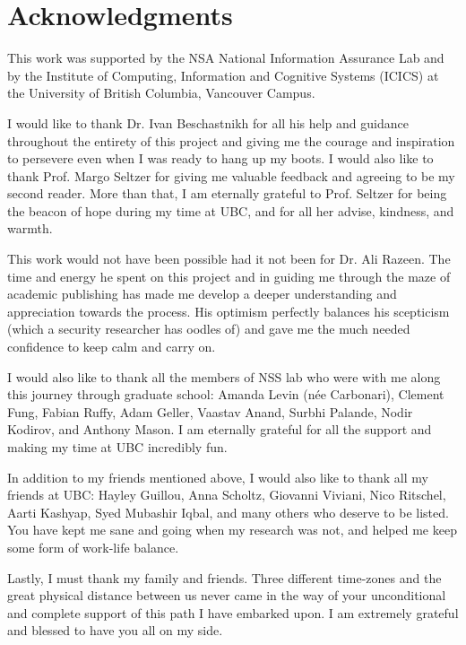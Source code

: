 
\chapter{Acknowledgments}

This work was supported by the NSA National Information Assurance Lab and by the Institute of Computing, Information and Cognitive Systems (ICICS) at the University of British Columbia, Vancouver Campus.

I would like to thank Dr. Ivan Beschastnikh for all his help and guidance throughout the entirety of this project and giving me the courage and inspiration to persevere even when I was ready to hang up my boots. I would also like to thank Prof. Margo Seltzer for giving me valuable feedback and agreeing to be my second reader. More than that, I am eternally grateful to Prof. Seltzer for being the beacon of hope during my time at UBC, and for all her advise, kindness, and warmth. 

This work would not have been possible had it not been for Dr. Ali Razeen. The time and energy he spent on this project and in guiding me through the maze of academic publishing has made me develop a deeper understanding and appreciation towards the process. His optimism perfectly balances his scepticism (which a security researcher has oodles of) and gave me the much needed confidence to keep calm and carry on.

I would also like to thank all the members of NSS lab who were with me along this journey through graduate school: Amanda Levin (n\'ee Carbonari), Clement Fung, Fabian Ruffy, Adam Geller, Vaastav Anand, Surbhi Palande, Nodir Kodirov, and Anthony Mason. I am eternally grateful for all the support and making my time at UBC incredibly fun. 

In addition to my friends mentioned above, I would also like to thank all my friends at UBC: Hayley Guillou, Anna Scholtz, Giovanni Viviani, Nico Ritschel, Aarti Kashyap, Syed Mubashir Iqbal, and many others who deserve to be listed. You have kept me sane and going when my research was not, and helped me keep some form of work-life balance. 

Lastly, I must thank my family and friends. Three different time-zones and the great physical distance between us never came in the way of your unconditional and complete support of this path I have embarked upon. I am extremely grateful and blessed to have you all on my side.  